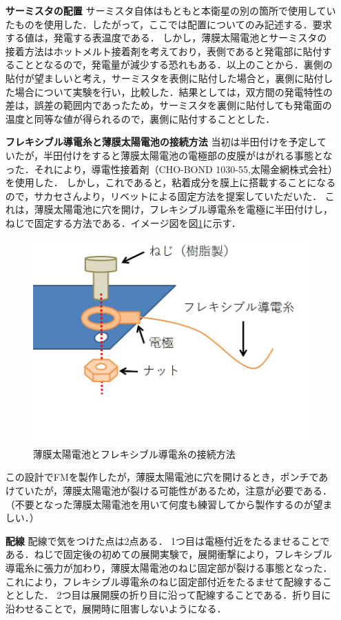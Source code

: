 \begin{itemize}
	\item [\textbf{サーミスタの配置}]
	サーミスタ自体はもともと本衛星の別の箇所で使用していたものを使用した．したがって，ここでは配置についてのみ記述する．要求する値は，発電する表温度である．
	しかし，薄膜太陽電池とサーミスタの接着方法はホットメルト接着剤を考えており，表側であると発電部に貼付することとなるので，発電量が減少する恐れもある．以上のことから．裏側の貼付が望ましいと考え，サーミスタを表側に貼付した場合と，裏側に貼付した場合について実験を行い，比較した．結果としては，双方間の発電特性の差は，誤差の範囲内であったため，サーミスタを裏側に貼付しても発電面の温度と同等な値が得られるので，裏側に貼付することとした．\\
	\item [\textbf{フレキシブル導電糸と薄膜太陽電池の接続方法}]
	当初は半田付けを予定していたが，半田付けをすると薄膜太陽電池の電極部の皮膜がはがれる事態となった．それにより，導電性接着剤（CHO-BOND 1030-55,太陽金網株式会社）を使用した．
	しかし，これであると，粘着成分を膜上に搭載することになるので，サカセさんより，リベットによる固定方法を提案していただいた．
	これは，薄膜太陽電池に穴を開け，フレキシブル導電糸を電極に半田付けし，ねじで固定する方法である．イメージ図を図\ref{fig3-9-3-2}に示す．\\
	\begin{figure}[H]
		\centering
		\includegraphics[scale=0.7]{03/fig/how_to_fix_TFSC.jpg}
		\caption{薄膜太陽電池とフレキシブル導電糸の接続方法}
		\label{fig3-9-3-2}
	\end{figure}
	この設計でFMを製作したが，薄膜太陽電池に穴を開けるとき，ポンチであけていたが，薄膜太陽電池が裂ける可能性があるため，注意が必要である．（不要となった薄膜太陽電池を用いて何度も練習してから製作するのが望ましい．）\\
	\item [\textbf{配線}]
	配線で気をつけた点は2点ある．
	1つ目は電極付近をたるませることである．ねじで固定後の初めての展開実験で，展開衝撃により，フレキシブル導電糸に張力が加わり，薄膜太陽電池のねじ固定部が裂ける事態となった．これにより，フレキシブル導電糸のねじ固定部付近をたるませて配線することとした．
	2つ目は展開膜の折り目に沿って配線することである．折り目に沿わせることで，展開時に阻害しないようになる．
\end{itemize}

